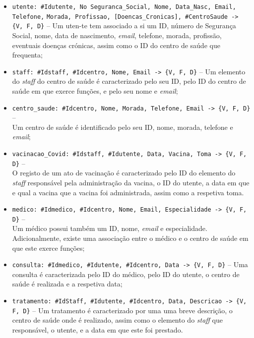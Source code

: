 \documentclass[a4paper, 11pt]{article}
\begin{document}
\begin{itemize}
    \item \texttt{utente: \#Idutente, No Seguranca\_Social, Nome, Data\_Nasc, Email, Telefone,} 
\texttt{Morada, Profissao,
    [Doencas\_Cronicas], \#CentroSaude -> \{V, F, D\}} -- Um uten-te tem associado a si um ID,
    número de Segurança Social, nome, data de nascimento, \textit{email}, telefone, morada, 
profissão, eventuais doenças
    crónicas, assim como o ID do centro de saúde que frequenta;
    \item \texttt{staff: \#Idstaff, \#Idcentro, Nome, Email -> \{V, F, D\}} -- Um elemento do 
\textit{staff} do centro de saúde
    é caracterizado pelo seu ID, pelo ID do centro de saúde em que exerce funções, e pelo seu 
nome e \textit{email};
    \item \texttt{centro\_saude: \#Idcentro, Nome, Morada, Telefone, Email -> \{V, F, D\}} -- \\Um 
centro de saúde é identificado
    pelo seu ID, nome, morada, telefone e \textit{email};
    \item \texttt{vacinacao\_Covid: \#Idstaff, \#Idutente, Data, Vacina, Toma -> \{V, F, D\}} -- 
\\O registo de um ato de
    vacinação é caracterizado pelo ID do elemento do \textit{staff} responsável pela 
administração da vacina, o ID do utente,
    a data em que e qual a vacina que a vacina foi administrada, assim como a respetiva toma.
    \item \texttt{medico: \#Idmedico, \#Idcentro, Nome, Email, Especialidade -> \{V, F, D\}} -- 
\\Um médico 
    possui também um ID, nome, \textit{email} e especialidade. Adicionalmente, existe uma 
associação entre o
    médico e o centro de saúde em que este exerce funções;
    \item \texttt{consulta: \#Idmedico, \#Idutente, \#Idcentro, Data -> \{V, F, D\}} -- Uma 
consulta é caracterizada pelo ID
    do médico, pelo ID do utente, o centro de saúde é realizada e a respetiva data;
    \item \texttt{tratamento: \#IdStaff, \#Idutente, \#Idcentro, Data, Descricao -> \{V, F, D\}} -- 
Um tratamento é caracterizado
    por uma uma breve descrição, o centro de saúde onde é realizado, assim como o elemento do 
\textit{staff} que responsável,
    o utente, e a data em que este foi prestado.
\end{itemize}
\end{document}
